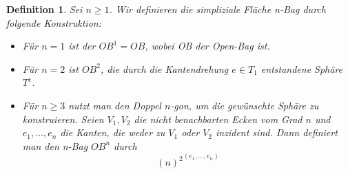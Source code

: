 \documentclass[12pt,titlepage,twoside,cleardoublepage]{article}
\theoremstyle{nummermitklammern}
\newtheorem{definition}[temp]{Definition}
\newtheorem{definition}[zahl]{Definition}
\numberwithin{equation}{section}
\begin{document}
\begin{definition}
Sei $n\geq 1$. Wir definieren die simpliziale Fläche n-Bag durch folgende Konstruktion:
\begin{itemize}
\item Für $n=1$ ist der $OB^1=OB$, wobei OB der Open-Bag ist.
\item Für $n=2$ ist $OB^2$, die durch die Kantendrehung $e\in T_1$ entstandene Sphäre $T^e$.
\item Für $n\geq 3$ nutzt man den Doppel $n$-gon, um die gewünschte Sphäre zu konstruieren. Seien $V_1,V_2$ die nicht benachbarten Ecken vom Grad $n$ und $e_1,\ldots, e_n$ die Kanten, die weder zu $V_1$ oder $V_2$ inzident sind. Dann definiert man den n-Bag $OB^n$ durch
\[
{(n)^2}^{(e_1,\ldots,e_n)}
\]
\end{itemize}
\begin{comment}
Sei $(OB^i,$ nun für $i\in \{2,\ldots,n-1\}$ konstruiert. Dann definiert man $OB^{i+1}$ wie folgt:
Man schaut sich zunächst die simpliziale Fläche $(X,<)$ mit
\begin{align*}
X_0:=OB^i_0 \cup Y_0\\
X_1:=OB^i_1\cup Y_1\\
X_2:=OB^i_2 \cup Y_2,
\end{align*}
wobei $Y$ eine simpliziale Fläche ist, die isomorph zum Open-Bag ist und $Y \cap OB^i=\emptyset $ erfüllt. Sei $(e_1,e_2)$ der 2-Waist in $Y\subset X$ 
mit zugehörigen Knoten $V_1,V_2 \in Y_0\subset X_0$ und $e=\{ e',e''\}\in OB^i_1\subset X_1$ eine Kante mit $X_1(e)=\{V,V'\}$ und $3 \notin \{deg_X(V),deg_X(V')\}$.
Man führt nun folgende Mender und Mutteroperationen durch:
\begin{enumerate}
\item Man wendet den Krater Cut $W:=C^C_{\{e',e''\}}(X)$ an und erhält die Kanten $e',e''\in W_1$ mit 
\begin{align*}
W_0(e') = W_0(e'')=\{V_1,V_2\}
\end{align*}
\item Durch den Split Mender entstehen die simpliziale Fläche  $Z:=S^m_{(V_1,e_1),(V,e')}(W)$, in der die Knoten $\{V_1,V\},\{V_2,V'\}$ und Kante $\{e_1,e'\}$ folgende Inzidenzen erfüllen:
\begin{align*}
Z_0(\{e_1,e'\}) = Z_0(e_2) = Z_0(e'')=\{\{V_1,V\},\{V_2,V'\}\}
\end{align*}
\item Schlussendlich gilt in $OB^{i+1}:=C^m_{e_2,e''}(Z)$, dass
\[
OB^{i+1}_0(\{e_1,e'\})=OB^{i+1}_0(\{e_2,e''\})=\{\{V_1,V\},\{V_2,V'\}\}
\]
ist.
\end{enumerate}
\end{comment}
\end{definition}
\end{document}

